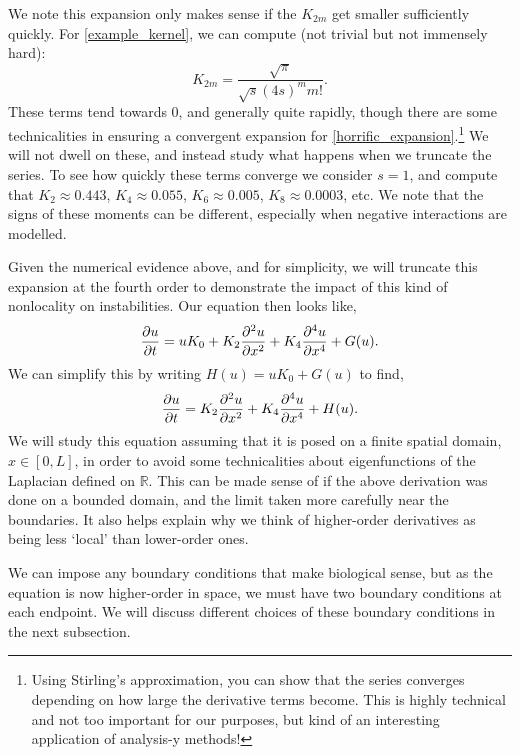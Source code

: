 \documentclass[main.tex]{subfiles}
\begin{document}
We note this expansion only makes sense if the $K_{2m}$ get smaller sufficiently quickly. For \cref{example_kernel}, we can compute (not trivial but not immensely hard):
\begin{equation}
    K_{2m} = \frac{\sqrt{\pi}}{\sqrt{s}(4s)^m m!}.
\end{equation}
These terms tend towards $0$, and generally quite rapidly, though there are some technicalities in ensuring a convergent expansion for \cref{horrific_expansion}.\footnote{Using Stirling's approximation, you can show that the series converges depending on how large the derivative terms become. This is highly technical and not too important for our purposes, but kind of an interesting application of analysis-y methods!} We will not dwell on these, and instead study what happens when we truncate the series. To see how quickly these terms converge we consider $s=1$, and compute that $K_2 \approx 0.443$, $K_4 \approx 0.055$,  $K_6 \approx 0.005$, $K_8 \approx 0.0003$,  etc. We note that the signs of these moments can be different, especially when negative interactions are modelled.

Given the numerical evidence above, and for simplicity, we will truncate this expansion at the fourth order to demonstrate the impact of this kind of nonlocality on instabilities. Our equation then looks like,
\begin{equation}\label{biharmonic_PDE_pre}
    \pd{u}{t} = uK_0 +K_2\pdd{u}{x}+K_4\pdn{4}{u}{x} + G(u).
\end{equation}
We can simplify this by writing $H(u) = uK_0+G(u)$ to find,
\begin{equation}\label{biharmonic_PDE}
    \pd{u}{t} = K_2\pdd{u}{x}+K_4\pdn{4}{u}{x} + H(u).
\end{equation}
We will study this equation assuming that it is posed on a finite spatial domain, $x \in [0,L]$, in order to avoid some technicalities about eigenfunctions of the Laplacian defined on $\mathbb{R}$. This can be made sense of if the above derivation was done on a bounded domain, and the limit taken more carefully near the boundaries. It also helps explain why we think of higher-order derivatives as being less `local' than lower-order ones.

We can impose any boundary conditions that make biological sense, but as the equation is now higher-order in space, we must have two boundary conditions at each endpoint. We will discuss different choices of these boundary conditions in the next subsection.
\end{document}
